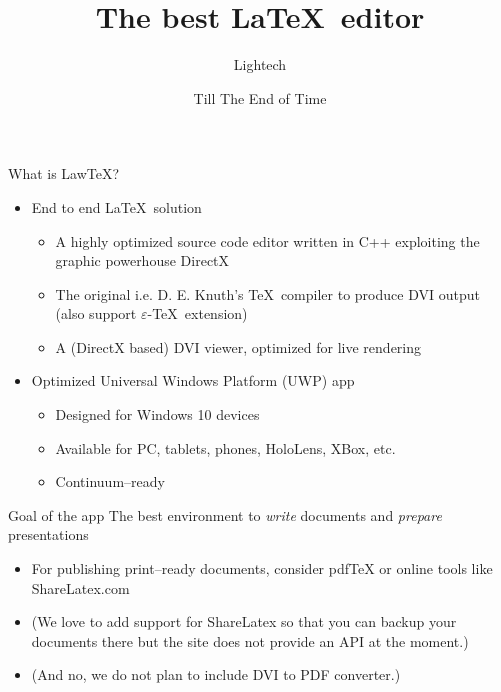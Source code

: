 \documentclass{beamer}
\title{The best \LaTeX\ editor}
\author{Lightech}
\date{Till The End of Time} %
\begin{document}
\maketitle

\begin{frame}{What is LawTeX?}
\begin{itemize}
\item End to end \LaTeX\ solution
\begin{itemize}
\item A highly optimized source code editor written in C++ exploiting the graphic powerhouse DirectX
\item The original i.e. D. E. Knuth's \TeX\ compiler to produce DVI output
(also support $\varepsilon$-\TeX\ extension)
\item A (DirectX based) DVI viewer, optimized for live rendering
\end{itemize}
\item Optimized Universal Windows Platform (UWP) app
\begin{itemize}
\item Designed for Windows 10 devices
\item Available for PC, tablets, phones, HoloLens, XBox, etc.
\item Continuum--ready
\end{itemize}
\end{itemize}
\end{frame}

\begin{frame}{Goal of the app}
The best environment to \emph{write} documents and \emph{prepare} presentations
\begin{itemize}
\item For publishing print--ready documents, consider pdfTeX or online tools like ShareLatex.com
\item (We love to add support for ShareLatex so that you can backup your documents there but the site does not provide an API at the moment.)
\item (And no, we do not plan to include DVI to PDF converter.)
\end{itemize}
\end{frame}
\end{document}
